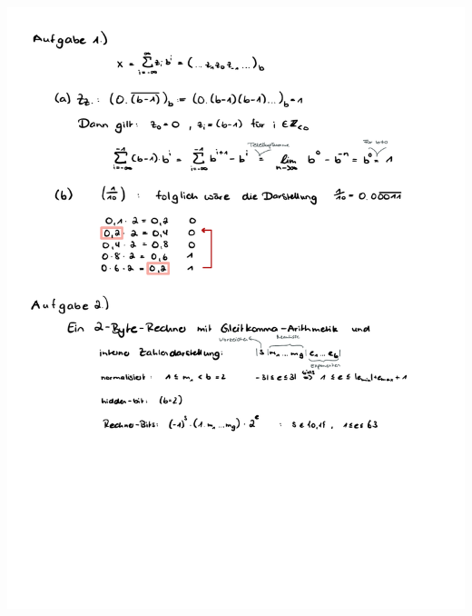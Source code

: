 \documentclass[a4paper,oneside,11pt]{scrartcl}
\begin{document}
\begin{minipage}[t]{\textwidth}
\includegraphics[scale = 0.75, page=2]{AlMa_blatt02.pdf}
\end{minipage}
\pagebreak
\end{document}

